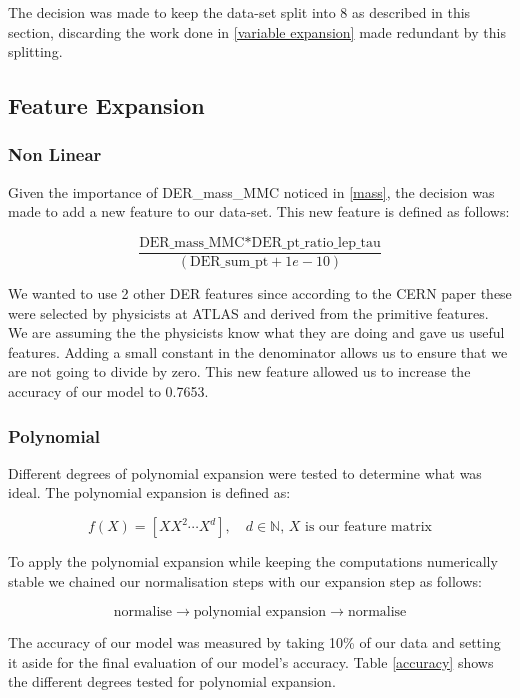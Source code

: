 \documentclass[10pt,conference,compsocconf]{IEEEtran}
\begin{document}
The decision was made to keep the data-set split into 8 as described in this section, discarding the work done in \ref{variable expansion} made redundant by this splitting.


\subsection{Feature Expansion}

\subsubsection{Non Linear}

Given the importance of DER\_mass\_MMC noticed in \ref{mass}, the decision was made to add a new feature to our data-set.
This new feature is defined as follows:

$$ \frac{\textrm{DER\_mass\_MMC} * \textrm{DER\_pt\_ratio\_lep\_tau}}{(\textrm{DER\_sum\_pt}+1e-10)} $$

We wanted to use 2 other DER features since according to the CERN paper \cite{higscern} these were selected by physicists at ATLAS and derived from the primitive features. We are assuming the the physicists know what they are doing and gave us useful features. Adding a small constant in the denominator allows us to ensure that we are not going to divide by zero.
This new feature allowed us to increase the accuracy of our model to 0.7653.

\subsubsection{Polynomial}

Different degrees of polynomial expansion were tested to determine what was ideal.
The polynomial expansion is defined as:

$$ f(X) = [ XX^2 \cdots X^d], \quad d \in \mathbb{N}, \, X \textrm{ is our feature matrix}  $$

To apply the polynomial expansion while keeping the computations numerically stable we chained our normalisation steps with our expansion step as follows:

$$\textrm{normalise} \xrightarrow{} \textrm{polynomial expansion} \xrightarrow{} \textrm{normalise} $$

The accuracy of our model was measured by taking 10\% of our data and setting it aside for the final evaluation of our model's accuracy. Table \ref{accuracy} shows the different degrees tested for polynomial expansion.
\end{document}
